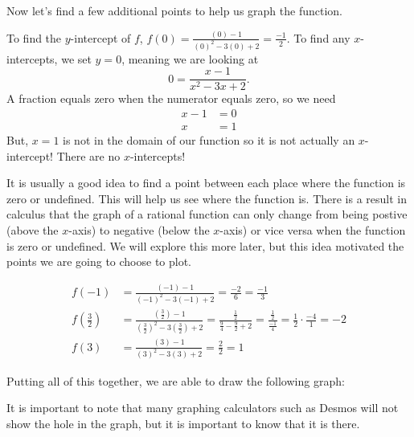 \documentclass{ximera}
\begin{document}
Now let's find a few additional points to help us graph the function.

To find the $y$-intercept of $f$, $f(0)=\frac{(0)-1}{(0)^2-3(0)+2}=\frac{-1}{2}$.  To find any $x$-intercepts, we set $y=0$, meaning we are looking at
$$0=\frac{x-1}{x^2-3x+2}.$$
A fraction equals zero when the numerator equals zero, so we need
\begin{align*}
x-1&=0\\
x&=1
\end{align*}
But, $x=1$ is not in the domain of our function so it is not actually an $x$-intercept!  There are no $x$-intercepts!

It is usually a good idea to find a point between each place where the function is zero or undefined.  This will help us see where the function is.  There is a result in calculus that the graph of a rational function can only change from being postive (above the $x$-axis) to negative (below the $x$-axis) or vice versa when the function is zero or undefined.  We will explore this more later, but this idea motivated the points we are going to choose to plot.

\begin{align*}
f(-1)&=\frac{(-1)-1}{(-1)^2-3(-1)+2}=\frac{-2}{6}=\frac{-1}{3}\\
f\left(\frac{3}{2}\right)&=\frac{\left(\frac{3}{2}\right)-1}{\left(\frac{3}{2}\right)^2-3\left(\frac{3}{2}\right)+2}=\frac{\frac{1}{2}}{\frac{9}{4}-\frac{9}{2}+2}=\frac{\frac{1}{2}}{\frac{-1}{4}}=\frac{1}{2} \cdot \frac{-4}{1}=-2\\
f(3)&=\frac{(3)-1}{(3)^2-3(3)+2}=\frac{2}{2}=1
\end{align*} 

Putting all of this together, we are able to draw the following graph:

      \begin{image}
      \end{image}

It is important to note that many graphing calculators such as Desmos will not show the hole in the graph, but it is important to know that it is there.
\end{document}
